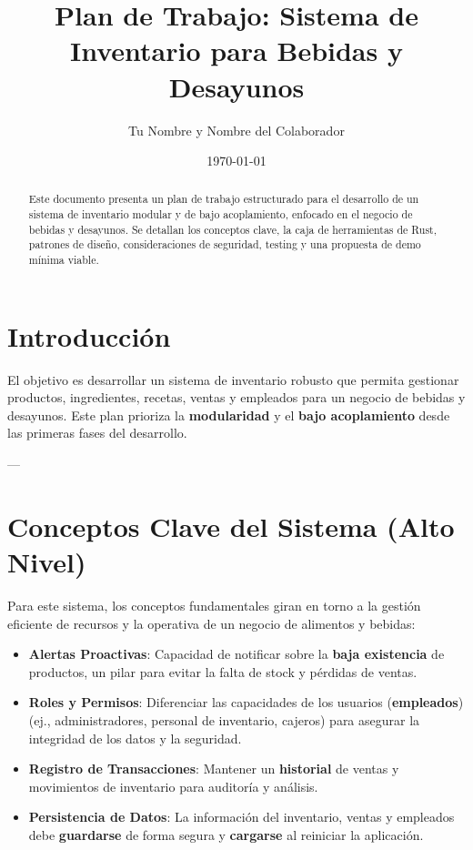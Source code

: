 \documentclass{article}
\title{Plan de Trabajo: Sistema de Inventario para Bebidas y Desayunos}
\author{Tu Nombre y Nombre del Colaborador}
\date{\today}
\begin{document}
	
	\maketitle
	
	\begin{abstract}
		Este documento presenta un plan de trabajo estructurado para el desarrollo de un sistema de inventario modular y de bajo acoplamiento, enfocado en el negocio de bebidas y desayunos. Se detallan los conceptos clave, la caja de herramientas de Rust, patrones de diseño, consideraciones de seguridad, testing y una propuesta de demo mínima viable.
	\end{abstract}
	
	\tableofcontents
	
	\section{Introducción}
	El objetivo es desarrollar un sistema de inventario robusto que permita gestionar productos, ingredientes, recetas, ventas y empleados para un negocio de bebidas y desayunos. Este plan prioriza la \textbf{modularidad} y el \textbf{bajo acoplamiento} desde las primeras fases del desarrollo.
	
	---
	
	\section{Conceptos Clave del Sistema (Alto Nivel)}
	Para este sistema, los conceptos fundamentales giran en torno a la gestión eficiente de recursos y la operativa de un negocio de alimentos y bebidas:
	
	\begin{itemize}[label=$\bullet$]%
		\item \textbf{Alertas Proactivas}: Capacidad de notificar sobre la \textbf{baja existencia} de productos, un pilar para evitar la falta de stock y pérdidas de ventas.
		\item \textbf{Roles y Permisos}: Diferenciar las capacidades de los usuarios (\textbf{empleados}) (ej., administradores, personal de inventario, cajeros) para asegurar la integridad de los datos y la seguridad.
		\item \textbf{Registro de Transacciones}: Mantener un \textbf{historial} de ventas y movimientos de inventario para auditoría y análisis.
		\item \textbf{Persistencia de Datos}: La información del inventario, ventas y empleados debe \textbf{guardarse} de forma segura y \textbf{cargarse} al reiniciar la aplicación.
	\end{itemize}
	
\end{document}
